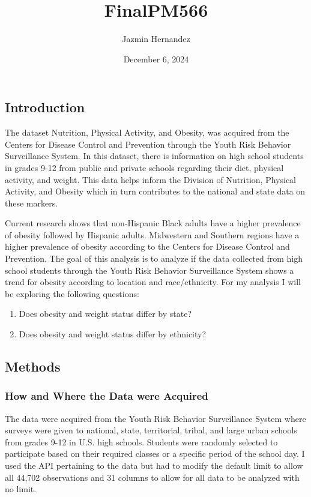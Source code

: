 \documentclass[
]{article}
\title{FinalPM566}
\author{Jazmin Hernandez}
\date{December 6, 2024}
\providecommand{\tightlist}{%
  \setlength{\itemsep}{0pt}\setlength{\parskip}{0pt}}
\begin{document}
\maketitle

\subsection{Introduction}\label{introduction}

The dataset Nutrition, Physical Activity, and Obesity, was acquired from
the Centers for Disease Control and Prevention through the Youth Risk
Behavior Surveillance System. In this dataset, there is information on
high school students in grades 9-12 from public and private schools
regarding their diet, physical activity, and weight. This data helps
inform the Division of Nutrition, Physical Activity, and Obesity which
in turn contributes to the national and state data on these markers.

Current research shows that non-Hispanic Black adults have a higher
prevalence of obesity followed by Hispanic adults. Midwestern and
Southern regions have a higher prevalence of obesity according to the
Centers for Disease Control and Prevention. The goal of this analysis is
to analyze if the data collected from high school students through the
Youth Risk Behavior Surveillance System shows a trend for obesity
according to location and race/ethnicity. For my analysis I will be
exploring the following questions:

\begin{enumerate}
\def\labelenumi{\arabic{enumi})}
\tightlist
\item
  Does obesity and weight status differ by state?
\item
  Does obesity and weight status differ by ethnicity?
\end{enumerate}

\subsection{Methods}\label{methods}

\subsubsection{How and Where the Data were
Acquired}\label{how-and-where-the-data-were-acquired}

The data were acquired from the Youth Risk Behavior Surveillance System
where surveys were given to national, state, territorial, tribal, and
large urban schools from grades 9-12 in U.S. high schools. Students were
randomly selected to participate based on their required classes or a
specific period of the school day. I used the API pertaining to the data
but had to modify the default limit to allow all 44,702 observations and
31 columns to allow for all data to be analyzed with no limit.
\end{document}
